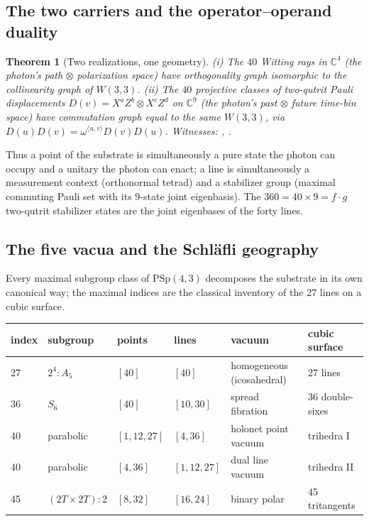 \documentclass[11pt]{article}
\newtheorem{theorem}{Theorem}[section]
\newcommand{\W}{W(3,3)}
\newcommand{\PSp}{\mathrm{PSp}}
\begin{document}
\subsection{The two carriers and the operator--operand duality}
\label{sec:duality}

\begin{theorem}[Two realizations, one geometry]
\label{thm:duality}
\textup{(i)} The $40$ Witting rays in $\mathbb{C}^4$ (the photon's
path$\,\otimes\,$polarization space) have orthogonality graph
isomorphic to the collinearity graph of $\W$.
\textup{(ii)} The $40$ projective classes of two-qutrit Pauli
displacements $D(v)=X^{a}Z^{b}\!\otimes\!X^{c}Z^{d}$ on $\mathbb{C}^9$
(the photon's past$\,\otimes\,$future time-bin space) have commutation
graph equal to the same $\W$, via
$D(u)D(v)=\omega^{\langle u,v\rangle}D(v)D(u)$.
\emph{Witnesses: ,
.}
\end{theorem}

Thus a point of the substrate is simultaneously a pure state the photon
can occupy and a unitary the photon can enact; a line is simultaneously
a measurement context (orthonormal tetrad) and a stabilizer group
(maximal commuting Pauli set with its $9$-state joint eigenbasis).  The
$360 = 40\times 9 = f\cdot g$ two-qutrit stabilizer states are the
joint eigenbases of the forty lines.

\subsection{The five vacua and the Schl\"afli geography}

Every maximal subgroup class of $\PSp(4,3)$ decomposes the substrate
in its own canonical way; the maximal indices are the classical
inventory of the $27$ lines on a cubic surface.

\begin{center}\small
\begin{tabular}{llllll}
\toprule
index & subgroup & points & lines & vacuum & cubic surface\\
\midrule
27 & $2^4{:}A_5$ & $[40]$ & $[40]$ & homogeneous (icosahedral) & 27 lines\\
36 & $S_6$ & $[40]$ & $[10,30]$ & spread fibration & 36 double-sixes\\
40 & parabolic & $[1,12,27]$ & $[4,36]$ & holonet point vacuum & trihedra I\\
40 & parabolic & $[4,36]$ & $[1,12,27]$ & dual line vacuum & trihedra II\\
45 & $(2T{\times}2T){:}2$ & $[8,32]$ & $[16,24]$ & binary polar & 45 tritangents\\
\bottomrule
\end{tabular}
\end{center}
\end{document}
